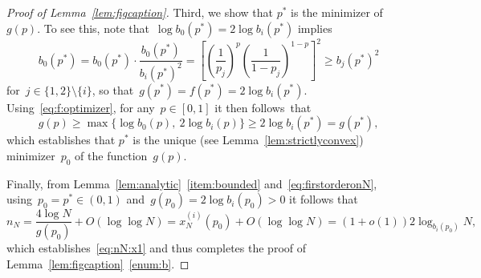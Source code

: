\documentclass{article}
\newcommand\lrpar[1]{\left(#1\right)}
\newcommand{\xonetwo}{x^{(i)}}
\newcommand{\pz}{p^*}
\newcommand\lrsqpar[1]{\left[#1\right]}
\newcommand\bigcpar[1]{\bigl\{#1\bigr\}}
\begin{document}
\begin{proof}[Proof of Lemma~\ref{lem:figcaption}]
Third, we show that $\pz$ is the minimizer of~$g(p)$.
To see this, note that~$\log b_0(\pz)=2\log b_i(\pz)$ implies
\[ b_0(\pz) = b_0(\pz)  \cdot \frac{b_0(\pz)}{b_i(\pz)^2} 
=\lrsqpar{\lrpar{\frac{1}{p_j}}^p \lrpar{\frac{1}{ 1-p_j}}^{1-p}}^2 \ge b_j(\pz)^2  \]
for~$j \in \{1,2\} \setminus \{i\}$,
so that~$g(\pz)=f(\pz) = 2\log b_i(\pz)$. 
Using~\eqref{eq:f:optimizer}, for any~$p\in [0,1]$ it then follows~that
\[ g(p)\ge \max\bigcpar{\log b_0(p),\: 2\log b_i(p)} \ge  2\log b_i(\pz)=  g(\pz),\]
which establishes that $\pz$ is the unique (see Lemma~\ref{lem:strictlyconvex}) minimizer~$p_0$ of the function~$g(p)$. 

Finally, from Lemma~\ref{lem:analytic}~\ref{item:bounded} and~\eqref{eq:firstorderonN}, 
using~$p_0=\pz \in (0,1)$ and~$g(p_0)=2\log b_i(p_0)>0$ it follows that 
\[ n_N= \frac{4\log N}{g(p_0)} + O(\log\log N)= \xonetwo_N(p_0) + O(\log\log N) =(1+o(1)) 2\log_{b_i(p_0)}N , \]
which establishes~\eqref{eq:nN:x1} and thus 
completes the proof of Lemma~\ref{lem:figcaption}~\ref{enum:b}.
\end{proof}
\end{document}
